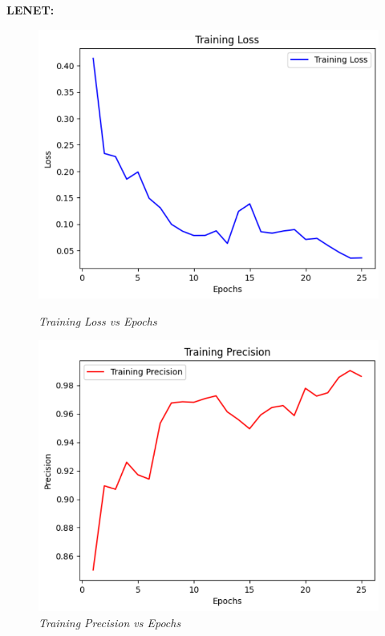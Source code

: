 \documentclass[12pt, a4paper]{report}
\begin{document}
\vspace{6cm}
\textbf{LENET:}

\begin{figure}[htbp]
    \centering
    \begin{minipage}{0.4\textwidth}
        \centering
        \includegraphics[width=\linewidth]{report images/image13.png}
        \caption{\textit{Training Loss vs Epochs}}
    \end{minipage}%
    \hspace{0.05\textwidth} %
    \begin{minipage}{0.4\textwidth}
        \centering
        \includegraphics[width=\linewidth]{report images/image14.png}
        \caption{\textit{Training Precision vs Epochs}}
    \end{minipage}
\end{figure}
\end{document}
